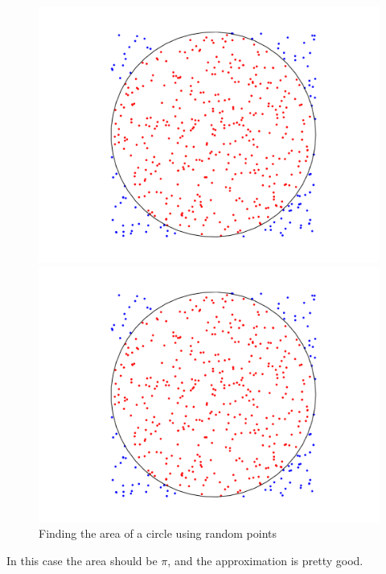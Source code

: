 \begin{figure}[h!]
\begin{center}
\begin{matlab}
\includegraphics[scale = .4]{MCCircle}
\end{matlab}
\begin{python}
\includegraphics[scale = .4]{MCCircle}
\end{python}
\caption{Finding the area of a circle using random points}
\label{Fig:MCCircle}
\end{center}
\end{figure}

In this case the area should be $\pi$, and the approximation is pretty good.

